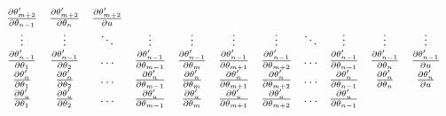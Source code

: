 \begin{equation}
\begin{split}
\begin{array}{ccccccccccc}
        \frac{\partial \parameter[m+2]\proposed}{\partial \parameter[n-1]} &
        \frac{\partial \parameter[m+2]\proposed}{\partial \parameter[n]} &
        \frac{\partial \parameter[m+2]\proposed}{\partial \uniformdeviate} \\
        \vdots &
        \vdots &
        \ddots &
        \vdots &
        \vdots &
        \vdots &
        \vdots &
        \ddots &
        \vdots &
        \vdots &
        \vdots \\
        \frac{\partial \parameter[n-1]\proposed}{\partial \parameter[1]} &
        \frac{\partial \parameter[n-1]\proposed}{\partial \parameter[2]} &
        \ldots &
        \frac{\partial \parameter[n-1]\proposed}{\partial \parameter[m-1]} &
        \frac{\partial \parameter[n-1]\proposed}{\partial \parameter[m]} &
        \frac{\partial \parameter[n-1]\proposed}{\partial \parameter[m+1]} &
        \frac{\partial \parameter[n-1]\proposed}{\partial \parameter[m+2]} &
        \ldots &
        \frac{\partial \parameter[n-1]\proposed}{\partial \parameter[n-1]} &
        \frac{\partial \parameter[n-1]\proposed}{\partial \parameter[n]} &
        \frac{\partial \parameter[n-1]\proposed}{\partial \uniformdeviate} \\
        \frac{\partial \parameter[n]\proposed}{\partial \parameter[1]} &
        \frac{\partial \parameter[n]\proposed}{\partial \parameter[2]} &
        \ldots &
        \frac{\partial \parameter[n]\proposed}{\partial \parameter[m-1]} &
        \frac{\partial \parameter[n]\proposed}{\partial \parameter[m]} &
        \frac{\partial \parameter[n]\proposed}{\partial \parameter[m+1]} &
        \frac{\partial \parameter[n]\proposed}{\partial \parameter[m+2]} &
        \ldots &
        \frac{\partial \parameter[n]\proposed}{\partial \parameter[n-1]} &
        \frac{\partial \parameter[n]\proposed}{\partial \parameter[n]} &
        \frac{\partial \parameter[n]\proposed}{\partial \uniformdeviate} \\
        \frac{\partial \parameter[\uniformdeviate]\proposed}{\partial \parameter[1]} &
        \frac{\partial \parameter[\uniformdeviate]\proposed}{\partial \parameter[2]} &
        \ldots &
        \frac{\partial \parameter[\uniformdeviate]\proposed}{\partial \parameter[m-1]} &
        \frac{\partial \parameter[\uniformdeviate]\proposed}{\partial \parameter[m]} &
        \frac{\partial \parameter[\uniformdeviate]\proposed}{\partial \parameter[m+1]} &
        \frac{\partial \parameter[\uniformdeviate]\proposed}{\partial \parameter[m+2]} &
        \ldots &
        \frac{\partial \parameter[\uniformdeviate]\proposed}{\partial \parameter[n-1]} &

\end{array}
\end{split}
\end{equation}

